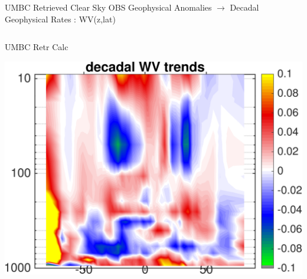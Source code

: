 \documentclass[10pt,t]{beamer}
\begin{document}
\begin{frame}{UMBC Retrieved Clear Sky OBS Geophysical Anomalies $\rightarrow$ Decadal Geophysical Rates : WV(z,lat)}
\begin{columns}
\begin{column}{0.45\columnwidth}
\begin{block}{\footnotesize UMBC Retr Calc}
\vspace{-0.1in}
\begin{center}
\includegraphics[width=\linewidth]{Figs/ClearAnom/umbc_clr_retr_cal_ptemp_rate_200209_201808.png}
\end{center}
\end{block}
\end{column}
\end{columns}

\end{frame}

\end{document}
